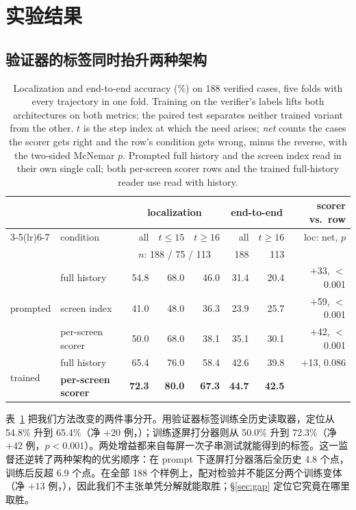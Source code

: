 \section{实验结果}

\subsection{验证器的标签同时抬升两种架构}
\label{sec:main}
\begin{table}[t]
\centering\scriptsize\engfont
\caption{\rm Localization and end-to-end accuracy (\%) on 188 verified cases, five folds with every trajectory in one fold. Training on the verifier's labels lifts both architectures on both metrics; the paired test separates neither trained variant from the other. $t$ is the step index at which the need arises; \emph{net} counts the cases the scorer gets right and the row's condition gets wrong, minus the reverse, with the two-sided McNemar $p$. Prompted full history and the screen index read in their own single call; both per-screen scorer rows and the trained full-history reader use read with history.}
\label{tab:main}
\begin{tabular}{llrrrrrr}
\toprule
 & & \multicolumn{3}{c}{localization} & \multicolumn{2}{c}{end-to-end} & scorer vs.\ row \\
\cmidrule(lr){3-5}\cmidrule(lr){6-7}
 & condition & all & $t\le15$ & $t\ge16$ & all & $t\ge16$ & loc: net, $p$ \\
 & & \multicolumn{3}{c}{$n$: 188 / 75 / 113} & 188 & 113 & \\
\midrule
\multirow{3}{*}{prompted} & full history & 54.8 & 68.0 & 46.0 & 31.4 & 20.4 & $+$33, $<$0.001 \\
 & screen index & 41.0 & 48.0 & 36.3 & 23.9 & 25.7 & $+$59, $<$0.001 \\
 & per-screen scorer & 50.0 & 68.0 & 38.1 & 35.1 & 30.1 & $+$42, $<$0.001 \\
\midrule
\multirow{2}{*}{trained} & full history & 65.4 & 76.0 & 58.4 & 42.6 & 39.8 & $+$13, 0.086 \\
 & \textbf{per-screen scorer} & \textbf{72.3} & \textbf{80.0} & \textbf{67.3} & \textbf{44.7} & \textbf{42.5} & \\
\bottomrule
\end{tabular}
\end{table}

表~\ref{tab:main} 把我们方法改变的两件事分开。用验证器标签训练全历史读取器，定位从 54.8\% 升到 65.4\%（净 $+20$ 例，）；训练逐屏打分器则从 50.0\% 升到 72.3\%（净 $+42$ 例，$p<0.001$）。两处增益都来自每屏一次子串测试就能得到的标签。这一监督还逆转了两种架构的优劣顺序：在 prompt 下逐屏打分器落后全历史 4.8 个点，训练后反超 6.9 个点。在全部 188 个样例上，配对检验并不能区分两个训练变体（净 $+13$ 例，），因此我们不主张单凭分解就能取胜；\S\ref{sec:gap} 定位它究竟在哪里取胜。

